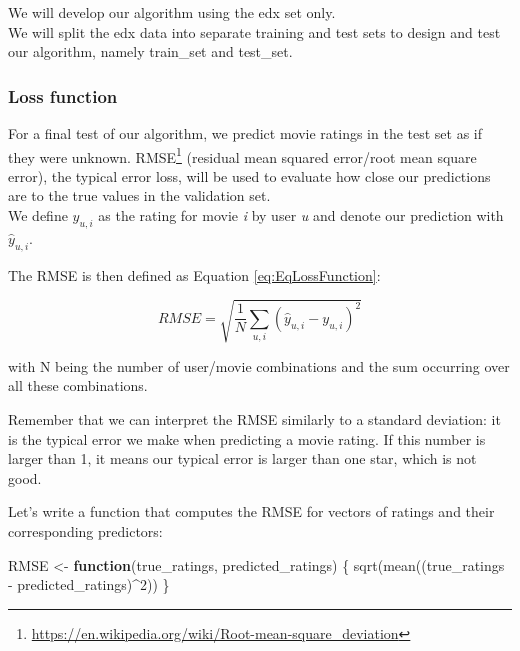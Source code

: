 \documentclass[
]{article}
\newenvironment{Shaded}{}{}
\newcommand{\ControlFlowTok}[1]{\textcolor[rgb]{0.00,0.44,0.13}{\textbf{#1}}}
\newcommand{\DecValTok}[1]{\textcolor[rgb]{0.25,0.63,0.44}{#1}}
\newcommand{\FunctionTok}[1]{\textcolor[rgb]{0.02,0.16,0.49}{#1}}
\newcommand{\NormalTok}[1]{#1}
\newcommand{\OtherTok}[1]{\textcolor[rgb]{0.00,0.44,0.13}{#1}}
\newcommand{\SpecialCharTok}[1]{\textcolor[rgb]{0.25,0.44,0.63}{#1}}
\DeclareRobustCommand{\href}[2]{#2\footnote{\url{#1}}}
\begin{document}
We will develop our algorithm using the edx set only.\\
We will split the edx data into separate training and test sets to
design and test our algorithm, namely train\_set and test\_set.

\hypertarget{loss-function}{%
\subsubsection{Loss function}\label{loss-function}}

For a final test of our algorithm, we predict movie ratings in the test
set as if they were unknown.
\href{https://en.wikipedia.org/wiki/Root-mean-square_deviation}{RMSE}
(residual mean squared error/root mean square error), the typical error
loss, will be used to evaluate how close our predictions are to the true
values in the validation set.\\
We define \({y_{u,i}}\) as the rating for movie \emph{i} by user
\emph{u} and denote our prediction with \({\hat{y}_{u,i}}\).

The RMSE is then defined as Equation \ref{eq:EqLossFunction}:

%
\par

\label{eq:EqLossFunction} \begin{equation}
  RMSE=\sqrt{\frac{1}{N}\sum_{u,i}(\hat{y}_{u,i}-y_{u,i})^{2}}
\end{equation}

with N being the number of user/movie combinations and the sum occurring
over all these combinations.

Remember that we can interpret the RMSE similarly to a standard
deviation: it is the typical error we make when predicting a movie
rating. If this number is larger than 1, it means our typical error is
larger than one star, which is not good.

Let's write a function that computes the RMSE for vectors of ratings and
their corresponding predictors:

\begin{Shaded}
\begin{Highlighting}[]
\NormalTok{RMSE }\OtherTok{\textless{}{-}} \ControlFlowTok{function}\NormalTok{(true\_ratings, predicted\_ratings) \{}
    \FunctionTok{sqrt}\NormalTok{(}\FunctionTok{mean}\NormalTok{((true\_ratings }\SpecialCharTok{{-}}\NormalTok{ predicted\_ratings)}\SpecialCharTok{\^{}}\DecValTok{2}\NormalTok{))}
\NormalTok{\}}
\end{Highlighting}
\end{Shaded}
\end{document}
